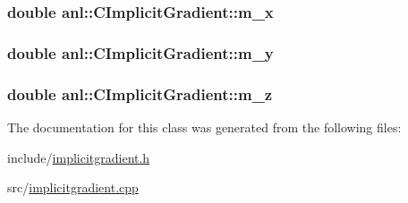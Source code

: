\label{classanl_1_1CImplicitGradient_af7a55f5ddae3894bab88fe9e21c18b8a}
\hypertarget{classanl_1_1CImplicitGradient_a1c3763e594df4c09fcb0b7f2185c9e21}{
\subsubsection[{m\_\-x}]{\setlength{\rightskip}{0pt plus 5cm}double {\bf anl::CImplicitGradient::m\_\-x}}}
\label{classanl_1_1CImplicitGradient_a1c3763e594df4c09fcb0b7f2185c9e21}
\hypertarget{classanl_1_1CImplicitGradient_af6d644f116b363fa6703b98d5500aa14}{
\subsubsection[{m\_\-y}]{\setlength{\rightskip}{0pt plus 5cm}double {\bf anl::CImplicitGradient::m\_\-y}}}
\label{classanl_1_1CImplicitGradient_af6d644f116b363fa6703b98d5500aa14}
\hypertarget{classanl_1_1CImplicitGradient_a7ea97d44c5a4a997df530e710ac2fa12}{
\subsubsection[{m\_\-z}]{\setlength{\rightskip}{0pt plus 5cm}double {\bf anl::CImplicitGradient::m\_\-z}}}
\label{classanl_1_1CImplicitGradient_a7ea97d44c5a4a997df530e710ac2fa12}


The documentation for this class was generated from the following files:\begin{DoxyCompactItemize}
\item 
include/\hyperlink{implicitgradient_8h}{implicitgradient.h}\item 
src/\hyperlink{implicitgradient_8cpp}{implicitgradient.cpp}\end{DoxyCompactItemize}
